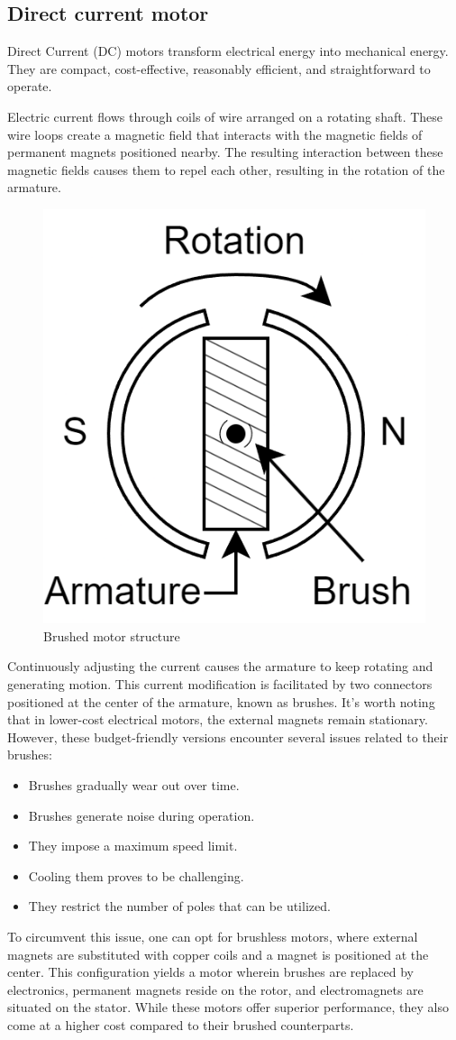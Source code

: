 \subsection{Direct current motor}
Direct Current (DC) motors transform electrical energy into mechanical energy.
They are compact, cost-effective, reasonably efficient, and straightforward to operate.

Electric current flows through coils of wire arranged on a rotating shaft. 
These wire loops create a magnetic field that interacts with the magnetic fields of permanent magnets positioned nearby. 
The resulting interaction between these magnetic fields causes them to repel each other, resulting in the rotation of the armature.

\begin{figure}[H]
    \centering
    \includegraphics[width=0.25\linewidth]{images/brushed.png}
    \caption{Brushed motor structure}
\end{figure}

Continuously adjusting the current causes the armature to keep rotating and generating motion. 
This current modification is facilitated by two connectors positioned at the center of the armature, known as brushes. 
It's worth noting that in lower-cost electrical motors, the external magnets remain stationary. 
However, these budget-friendly versions encounter several issues related to their brushes:
\begin{itemize}
    \item Brushes gradually wear out over time.
    \item Brushes generate noise during operation.
    \item They impose a maximum speed limit.
    \item Cooling them proves to be challenging.
    \item They restrict the number of poles that can be utilized.
\end{itemize}
To circumvent this issue, one can opt for brushless motors, where external magnets are substituted with copper coils and a magnet is positioned at the center. 
This configuration yields a motor wherein brushes are replaced by electronics, permanent magnets reside on the rotor, and electromagnets are situated on the stator. 
While these motors offer superior performance, they also come at a higher cost compared to their brushed counterparts.

